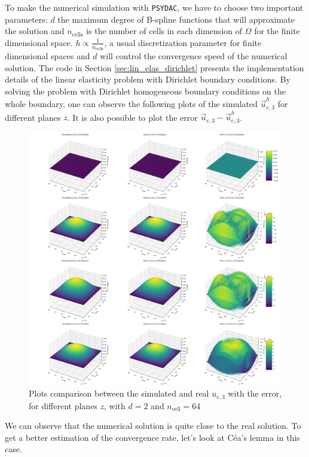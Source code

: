 \documentclass[a4paper,12pt,twoside]{report}
\begin{document}
To make the numerical simulation with \texttt{PSYDAC}, we have to choose two important parameters: $d$ the maximum degree of B-spline functions that will approximate the solution and $n_{\text{cells}}$ is the number of cells in each dimension of $\Omega$ for the finite dimensional space. $\displaystyle h \propto \frac{1}{n_{\text{cells}}}$, a usual discretization parameter for finite dimensional spaces and $d$ will control the convergence speed of the numerical solution. 
The code in Section \ref{sec:lin_elas_dirichlet} presents the implementation details of the linear elasticity problem with Dirichlet boundary conditions.
By solving the problem with Dirichlet homogeneous boundary conditions on the whole boundary, one can observe the following plots of the simulated $\vec u_{e,3}^h$ for different planes $z$. It is also possible to plot the error $\vec u_{e,3} - \vec u_{e,3}^h$.
\begin{figure}[!h]
	\centering
	\includegraphics[width=0.8\linewidth]{figures/3d_plots_degree_2_non_mixed_dirichlet_homogeneous_ncell=64.png}
	\caption{Plots comparison between the simulated and real $u_{e,3}$ with the error, for different planes $z$, with $d=2$ and $n_{\text{cell}} = 64$}
	\label{fig:3D_plots}
\end{figure}

We can observe that the numerical solution is quite close to the real solution. To get a better estimation of the convergence rate, let's look at Céa's lemma in this case.
\end{document}
